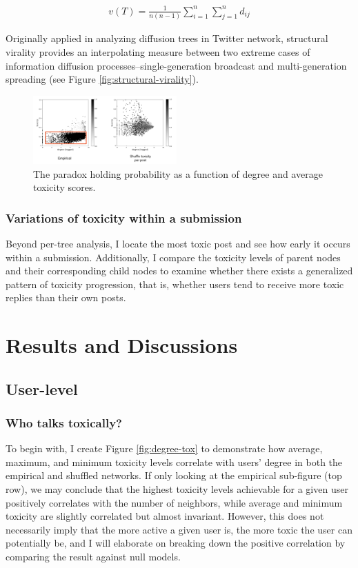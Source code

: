 \documentclass[10pt,twocolumn,letterpaper]{article}
\begin{document}
\begin{align*}
v(T) = 	\frac{1}{n(n-1)}\sum_{i=1}^n\sum_{j=1}^n d_{ij}
\end{align*}


Originally applied in analyzing diffusion trees in Twitter network, structural virality provides an interpolating measure between two extreme cases of information diffusion processes--single-generation broadcast and multi-generation spreading (see Figure \ref{fig:structural-virality}).

\begin{figure}
  \centering
  \includegraphics[width=0.49\textwidth]{figures/tp.png}
  \caption{The paradox holding probability as a function of degree and average toxicity scores.}
  \label{fig:tp-aggr}
\end{figure}


\subsubsection{Variations of toxicity within a submission}

Beyond per-tree analysis, I locate the most toxic post and see how early it occurs within a submission. Additionally, I compare the toxicity levels of parent nodes and their corresponding child nodes to examine whether there exists a generalized pattern of toxicity progression, that is, whether users tend to receive more toxic replies than their own posts.


\section{Results and Discussions}

\subsection{User-level}

\subsubsection{Who talks toxically?}

To begin with, I create Figure \ref{fig:degree-tox} to demonstrate how average, maximum, and minimum toxicity levels correlate with users' degree in both the empirical and shuffled networks. If only looking at the empirical sub-figure (top row), we may conclude that the highest toxicity levels achievable for a given user positively correlates with the number of neighbors, while average and minimum toxicity are slightly correlated but almost invariant. However, this does not necessarily imply that the more active a given user is, the more toxic the user can potentially be, and I will elaborate on breaking down the positive correlation by comparing the result against null models.
\end{document}
